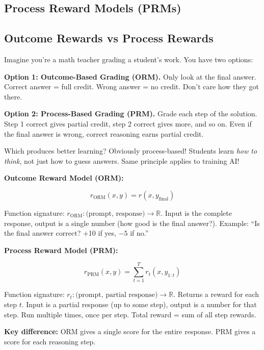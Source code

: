 \begin{chapterenv}

\chapter{Process Reward Models (PRMs)}

\section{Outcome Rewards vs Process Rewards}

Imagine you're a math teacher grading a student's work. You have two options:

\textbf{Option 1: Outcome-Based Grading (ORM).} Only look at the final answer. Correct answer = full credit. Wrong answer = no credit. Don't care how they got there.

\textbf{Option 2: Process-Based Grading (PRM).} Grade each step of the solution. Step 1 correct gives partial credit, step 2 correct gives more, and so on. Even if the final answer is wrong, correct reasoning earns partial credit.

Which produces better learning? Obviously process-based! Students learn \textit{how to think}, not just how to guess answers. Same principle applies to training AI!

\begin{infobox}
\textbf{Outcome Reward Model (ORM):}

$$r_{\text{ORM}}(x, y) = r(x, y_{\text{final}})$$

Function signature: $r_{\text{ORM}}: \text{(prompt, response)} \rightarrow \mathbb{R}$. Input is the complete response, output is a single number (how good is the final answer?). Example: ``Is the final answer correct? +10 if yes, $-5$ if no.''

\textbf{Process Reward Model (PRM):}

$$r_{\text{PRM}}(x, y) = \sum_{t=1}^T r_t(x, y_{1:t})$$

Function signature: $r_t: \text{(prompt, partial response)} \rightarrow \mathbb{R}$. Returns a reward for each step $t$. Input is a partial response (up to some step), output is a number for that step. Run multiple times, once per step. Total reward = sum of all step rewards.

\textbf{Key difference:} ORM gives a single score for the entire response. PRM gives a score for each reasoning step.
\end{infobox}


\end{chapterenv}
